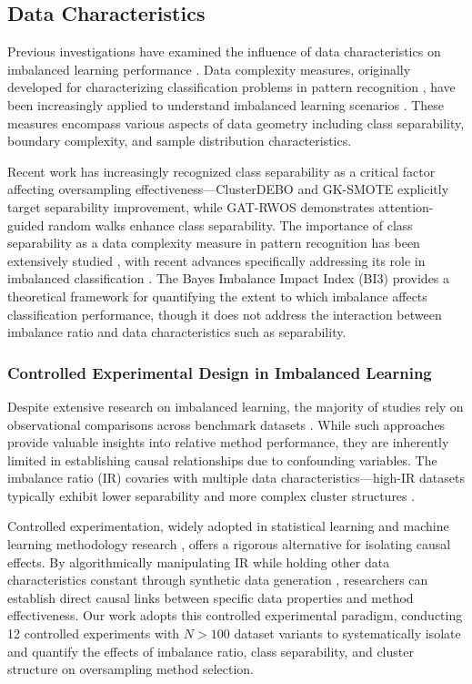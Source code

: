\documentclass{ijSmartGrid}
\theoremstyle{definition}
\begin{document}
\subsection{Data Characteristics}
\indent Previous investigations have examined the influence of data characteristics on imbalanced learning performance \cite{prati2009data,luengo2015addressing}. Data complexity measures, originally developed for characterizing classification problems in pattern recognition \cite{ho2002complexity}, have been increasingly applied to understand imbalanced learning scenarios \cite{sotoca2005data,lopez2013insight}. These measures encompass various aspects of data geometry including class separability, boundary complexity, and sample distribution characteristics.

Recent work has increasingly recognized class separability as a critical factor affecting oversampling effectiveness---ClusterDEBO \cite{clusterdebo2025} and GK-SMOTE \cite{gk_smote2025} explicitly target separability improvement, while GAT-RWOS \cite{gat_rwos2024} demonstrates attention-guided random walks enhance class separability. The importance of class separability as a data complexity measure in pattern recognition has been extensively studied \cite{ho2002complexity,sotoca2005data}, with recent advances specifically addressing its role in imbalanced classification \cite{pr2019bayesian,pr2020radial}. The Bayes Imbalance Impact Index (BI3) \cite{pr2019bayesian} provides a theoretical framework for quantifying the extent to which imbalance affects classification performance, though it does not address the interaction between imbalance ratio and data characteristics such as separability.

\subsubsection{Controlled Experimental Design in Imbalanced Learning}
\indent Despite extensive research on imbalanced learning, the majority of studies rely on observational comparisons across benchmark datasets \cite{fernandez2018smote}. While such approaches provide valuable insights into relative method performance, they are inherently limited in establishing causal relationships due to confounding variables. The imbalance ratio (IR) covaries with multiple data characteristics---high-IR datasets typically exhibit lower separability and more complex cluster structures \cite{pr2020radial,pr2019bayesian}.

Controlled experimentation, widely adopted in statistical learning and machine learning methodology research \cite{demsar2006statistical,benavoli2016should}, offers a rigorous alternative for isolating causal effects. By algorithmically manipulating IR while holding other data characteristics constant through synthetic data generation \cite{pr2020radial,pr2019radial}, researchers can establish direct causal links between specific data properties and method effectiveness. Our work adopts this controlled experimental paradigm, conducting 12 controlled experiments with $N>100$ dataset variants to systematically isolate and quantify the effects of imbalance ratio, class separability, and cluster structure on oversampling method selection.
\end{document}
